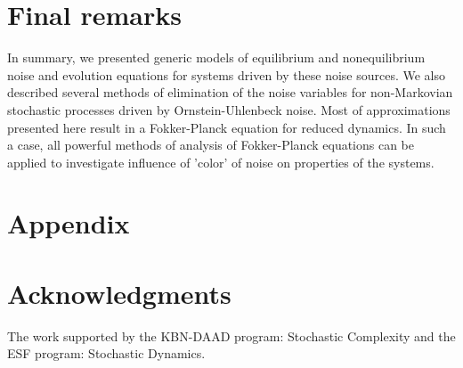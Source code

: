 \documentclass[authoryear,draft,1p,times]{elsarticle}
\renewcommand{\=}{\stackrel{\mathrm{d}}{=}}
\begin{document}

\section{Final remarks} 



In summary, we presented generic models of equilibrium and 
nonequilibrium noise and evolution equations for systems driven by 
these noise sources. We also 
 described several  methods of elimination of the noise variables 
for non-Markovian stochastic processes driven by Ornstein-Uhlenbeck noise. 
Most of approximations presented here result in a Fokker-Planck equation 
for  reduced dynamics. In such a case, all powerful methods of analysis 
of Fokker-Planck equations can be applied to investigate influence of 
'color' of noise on properties of the systems.  
 
\section{Appendix}






%

\section*{Acknowledgments}
The work supported by the KBN-DAAD program: Stochastic Complexity 
and the ESF program: Stochastic Dynamics.  
\end{document}
